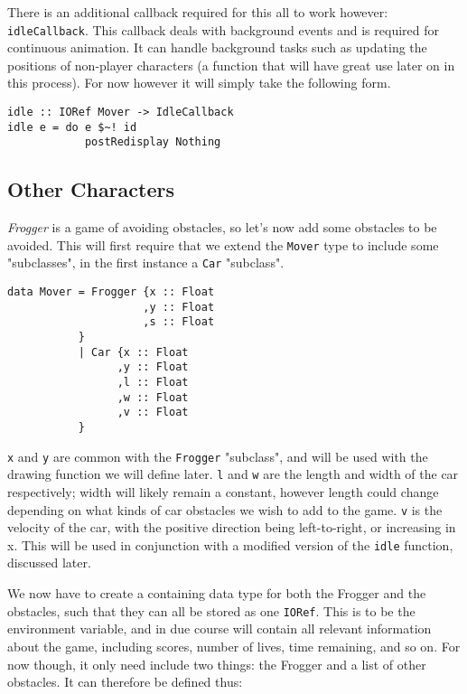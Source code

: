 \documentclass[12pt, a4paper]{report}
\begin{document}
There is an additional callback required for this all to work however: \verb|idleCallback|.
This callback deals with background events and is required for continuous animation.
It can handle background tasks such as updating the positions of non-player characters (a function that will have great use later on in this process).
For now however it will simply take the following form.

\begin{lstlisting}
idle :: IORef Mover -> IdleCallback
idle e = do e $~! id
            postRedisplay Nothing
\end{lstlisting}

\subsection{Other Characters}

\textit{Frogger} is a game of avoiding obstacles, so let's now add some obstacles to be avoided.
This will first require that we extend the \verb|Mover| type to include some "subclasses", in the first instance a \verb|Car| "subclass".

\begin{lstlisting}
data Mover = Frogger {x :: Float
                     ,y :: Float
                     ,s :: Float
           }
           | Car {x :: Float
                 ,y :: Float
                 ,l :: Float
                 ,w :: Float
                 ,v :: Float
           }
\end{lstlisting}

\verb|x| and \verb|y| are common with the \verb|Frogger| "subclass", and will be used with the drawing function we will define later.
\verb|l| and \verb|w| are the length and width of the car respectively; width will likely remain a constant, however length could change depending on what kinds of car obstacles we wish to add to the game.
\verb|v| is the velocity of the car, with the positive direction being left-to-right, or increasing in x.
This will be used in conjunction with a modified version of the \verb|idle| function, discussed later.


We now have to create a containing data type for both the Frogger and the obstacles, such that they can all be stored as one \verb|IORef|.
This is to be the environment variable, and in due course will contain all relevant information about the game, including scores, number of lives, time remaining, and so on.
For now though, it only need include two things: the Frogger and a list of other obstacles.
It can therefore be defined thus:
\end{document}
